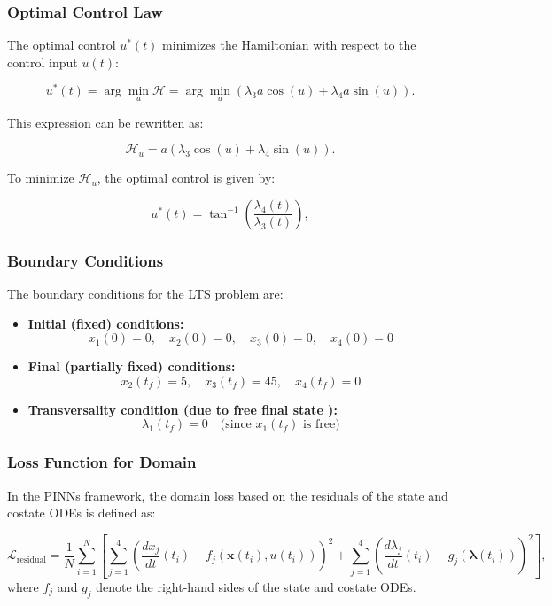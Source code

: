\subsubsection*{Optimal Control Law}

The optimal control \( u^*(t) \) minimizes the Hamiltonian with respect to the control input \( u(t) \):

\[
u^*(t) = \arg\min_u \mathcal{H} = \arg\min_u \left( \lambda_3 a \cos(u) + \lambda_4 a \sin(u) \right).
\]

This expression can be rewritten as:

\[
\mathcal{H}_{u} = a \left( \lambda_3 \cos(u) + \lambda_4 \sin(u) \right).
\]

To minimize \( \mathcal{H}_u \), the optimal control is given by:

\[
u^*(t) = \tan^{-1}\left( \frac{\lambda_4(t)}{\lambda_3(t)} \right) ,
\]


\subsubsection*{Boundary Conditions}

The boundary conditions for the LTS problem are:

\begin{itemize}
    \item \textbf{Initial (fixed) conditions:}
    \[
    x_1(0) = 0, \quad x_2(0) = 0, \quad x_3(0) = 0, \quad x_4(0) = 0
    \]
    \item \textbf{Final (partially fixed) conditions:}
    \[
    x_2(t_f) = 5, \quad x_3(t_f) = 45, \quad x_4(t_f) = 0
    \]
    \item \textbf{Transversality condition (due to free final state ):}
    \[
    \lambda_1(t_f) = 0 \quad \text{(since } x_1(t_f) \text{ is free)}
    \]
\end{itemize}

\subsubsection*{Loss Function for Domain}

In the PINNs framework, the domain loss based on the residuals of the state and costate ODEs is defined as:

\[
\mathcal{L}_{\text{residual}} = \frac{1}{N}\sum_{i=1}^{N} \left[ 
\sum_{j=1}^{4} \left( \frac{d x_j}{d t}(t_i) - f_j(\mathbf{x}(t_i), u(t_i)) \right)^2 
+ \sum_{j=1}^{4} \left( \frac{d \lambda_j}{d t}(t_i) - g_j(\boldsymbol{\lambda}(t_i)) \right)^2 
\right],
\]
where \(f_j\) and \(g_j\) denote the right-hand sides of the state and costate ODEs.


